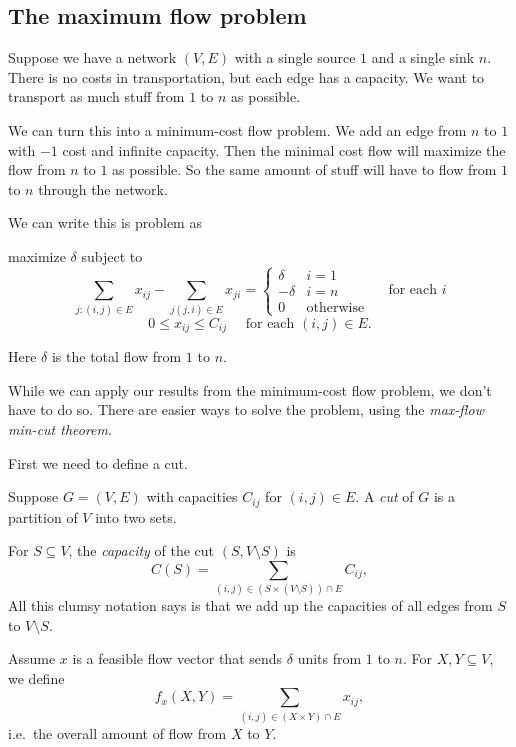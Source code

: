 \documentclass[a4paper]{article}
\begin{document}
\subsection{The maximum flow problem}
Suppose we have a network $(V, E)$ with a single source $1$ and a single sink $n$. There is no costs in transportation, but each edge has a capacity. We want to transport as much stuff from $1$ to $n$ as possible.

We can turn this into a minimum-cost flow problem. We add an edge from $n$ to $1$ with $-1$ cost and infinite capacity. Then the minimal cost flow will maximize the flow from $n$ to $1$ as possible. So the same amount of stuff will have to flow from $1$ to $n$ through the network.

We can write this is problem as
\begin{center}
  maximize $\delta$ subject to
  \[
    \sum_{j: (i, j) \in E}x_{ij} - \sum_{j(j, i)\in E}x_{ji} =
    \begin{cases}
      \delta & i = 1\\
      -\delta & i = n\\
      0&\text{otherwise}
    \end{cases}\quad\text{ for each }i
  \]
  \[
    0 \leq x_{ij}\leq C_{ij}\quad \text{ for each }(i, j)\in E.
  \]
\end{center}
Here $\delta$ is the total flow from $1$ to $n$.

While we can apply our results from the minimum-cost flow problem, we don't have to do so. There are easier ways to solve the problem, using the \emph{max-flow min-cut theorem}.

First we need to define a cut.
\begin{defi}[Cut]
  Suppose $G = (V, E)$ with capacities $C_{ij}$ for $(i, j)\in E$. A \emph{cut} of $G$ is a partition of $V$ into two sets.

  For $S\subseteq V$, the \emph{capacity} of the cut $(S, V\setminus S)$ is
  \[
    C(S) = \sum_{(i, j)\in (S\times (V\setminus S))\cap E}C_{ij},
  \]
  All this clumsy notation says is that we add up the capacities of all edges from $S$ to $V\setminus S$.
\end{defi}

Assume $x$ is a feasible flow vector that sends $\delta$ units from $1$ to $n$. For $X, Y\subseteq V$, we define
\[
  f_x(X, Y) = \sum_{(i, j)\in (X\times Y)\cap E}x_{ij},
\]
i.e.\ the overall amount of flow from $X$ to $Y$.
\end{document}
